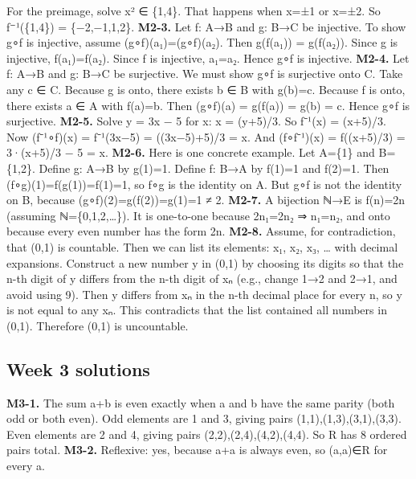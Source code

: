 \documentclass[11pt]{article}
\begin{document}
For the preimage, solve x² ∈ \{1,4\}. That happens when x=±1 or x=±2. So f⁻¹(\{1,4\}) =
\{−2,−1,1,2\}.
\textbf{M2-3.} Let f: A→B and g: B→C be injective. To show g∘f is injective, assume
(g∘f)(a₁)=(g∘f)(a₂).
Then g(f(a₁)) = g(f(a₂)). Since g is injective, f(a₁)=f(a₂). Since f is injective, a₁=a₂. Hence
g∘f is injective.
\textbf{M2-4.} Let f: A→B and g: B→C be surjective. We must show g∘f is surjective onto C.
Take any c ∈ C. Because g is onto, there exists b ∈ B with g(b)=c. Because f is onto, there
exists a ∈ A with f(a)=b.
Then (g∘f)(a) = g(f(a)) = g(b) = c. Hence g∘f is surjective.
\textbf{M2-5.} Solve y = 3x − 5 for x: x = (y+5)/3. So f⁻¹(x) = (x+5)/3.
Now (f⁻¹∘f)(x) = f⁻¹(3x−5) = ((3x−5)+5)/3 = x.
And (f∘f⁻¹)(x) = f((x+5)/3) = 3·(x+5)/3 − 5 = x.
\textbf{M2-6.} Here is one concrete example. Let A=\{1\} and B=\{1,2\}. Define g: A→B by g(1)=1.
Define f: B→A by f(1)=1 and f(2)=1.
Then (f∘g)(1)=f(g(1))=f(1)=1, so f∘g is the identity on A.
But g∘f is not the identity on B, because (g∘f)(2)=g(f(2))=g(1)=1 ≠ 2.
\textbf{M2-7.} A bijection ℕ→E is f(n)=2n (assuming ℕ=\{0,1,2,…\}).
It is one-to-one because 2n₁=2n₂ ⇒ n₁=n₂, and onto because every even number has the
form 2n.
\textbf{M2-8.} Assume, for contradiction, that (0,1) is countable. Then we can list its elements: x₁,
x₂, x₃, … with decimal expansions.
Construct a new number y in (0,1) by choosing its digits so that the n-th digit of y differs
from the n-th digit of xₙ (e.g., change 1→2 and 2→1, and avoid using 9).
Then y differs from xₙ in the n-th decimal place for every n, so y is not equal to any xₙ. This
contradicts that the list contained all numbers in (0,1).
Therefore (0,1) is uncountable.
\subsection{Week 3 solutions}
\textbf{M3-1.} The sum a+b is even exactly when a and b have the same parity (both odd or both
even).
Odd elements are 1 and 3, giving pairs (1,1),(1,3),(3,1),(3,3).
Even elements are 2 and 4, giving pairs (2,2),(2,4),(4,2),(4,4).
So R has 8 ordered pairs total.
\textbf{M3-2.} Reflexive: yes, because a+a is always even, so (a,a)∈R for every a.
\end{document}
